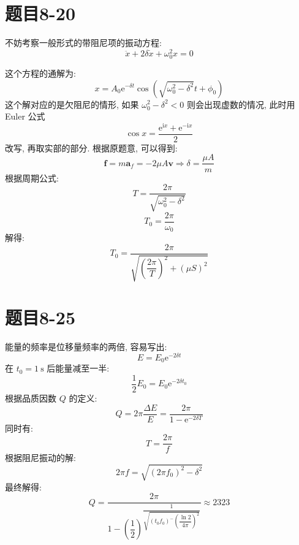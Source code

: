 \documentclass[12pt,a4paper]{article}
\begin{document}
		\section{题目8-20}
		不妨考察一般形式的带阻尼项的振动方程:
		\begin{equation}
			\ddot{x}+2\delta\dot{x}+\omega_0^2x=0
		\end{equation}
		
		这个方程的通解为:
		\begin{equation}
			x=A_0\mathrm{e}^{-\delta t}\cos\left(\sqrt{\omega_0^2-\delta^2}t+\phi_0 \right) 
		\end{equation}
		这个解对应的是欠阻尼的情形, 如果 $\omega_0^2-\delta^2<0$ 则会出现虚数的情况, 此时用 Euler 公式 
		$$
		\cos x=\dfrac{\mathrm{e}^{\mathrm{i}x}+\mathrm{e}^{-\mathrm{i}x}}{2}
		$$
		改写, 再取实部的部分. 根据原题意, 可以得到:
		\begin{equation}
			\boldsymbol{f}=m\boldsymbol{a}_f=-2\mu A\boldsymbol{v}\Longrightarrow\delta=\dfrac{\mu A}{m}
		\end{equation}
		根据周期公式:
		\begin{equation}
			T=\dfrac{2\pi}{\sqrt{\omega_0^2-\delta^2}}
		\end{equation}
		\vspace{0.3em}
		\begin{equation}
			T_0=\dfrac{2\pi}{\omega_0}
		\end{equation}
		解得:
		$$
		T_0=\dfrac{2\pi}{\sqrt{\left(\dfrac{2\pi}{T} \right)^2+\left(\mu S \right)^2  }}
		$$
		\section{题目8-25}
		能量的频率是位移量频率的两倍, 容易写出:
		\begin{equation}
			E=E_0\mathrm{e}^{-2\delta t}
		\end{equation}
		在 $t_0=1\ \mathrm{s}$ 后能量减至一半:
		\begin{equation}
			\dfrac{1}{2}E_0=E_0\mathrm{e}^{-2\delta t_0}
		\end{equation}
		根据品质因数 $Q$ 的定义:
		\begin{equation}
			Q=2\pi\dfrac{\Delta E}{E}=\dfrac{2\pi}{1-\mathrm{e}^{-2\delta T}}
		\end{equation}
		同时有:
		\begin{equation}
			T=\dfrac{2\pi}{f}
		\end{equation}
		根据阻尼振动的解:
		\begin{equation}
			2\pi f=\sqrt{\left( 2\pi f_0\right)^2-\delta^2 }
		\end{equation}
		最终解得:
		$$
		Q=\dfrac{2\pi}{1-{\left( \dfrac{1}{2}\right) }^{\dfrac{1}{\sqrt{\left( t_0f_0\right)^-\left( \dfrac{\ln 2}{4\pi}\right)^2  }}}}\approx2323
		$$
\end{document}
